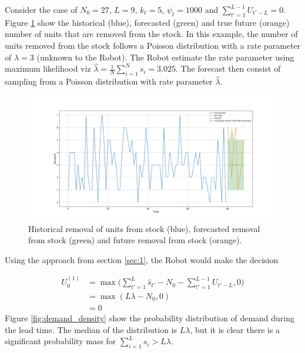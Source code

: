 \begin{example}
	Consider the case of $N_0=27$, $L = 9$, $k_t=5$, $\psi_t=1000$ and $\sum_{t'=1}^{L-1}U_{t'-L}=0$. Figure \ref{fig:forecast_example} show the historical (blue), forecasted (green) and true future (orange) number of units that are removed from the stock. In this example, the number of units removed from the stock follows a Poisson distribution with a rate parameter of $\lambda= 3$ (unknown to the Robot). The Robot estimate the rate parameter using maximum likelihood viz $\hat{\lambda}= \frac{1}{N}\sum_{i=1}^{N}s_i=3.025$. The forecast then consist of sampling from a Poisson distribution with rate parameter $\hat{\lambda}$.
	\begin{figure}[H]
		\centering
		\includegraphics[width = 1\textwidth]{figures/forecast_example.png}
		\caption{Historical removal of units from stock (blue), forecasted removal from stock (green) and future removal from stock (orange).}
		\label{fig:forecast_example}
	\end{figure}
	Using the approach from section \ref{sec:1}, the Robot would make the decision
	
	\begin{equation}
		\begin{split}
			U_0^{(1)} &= \max\bigg(\sum_{t'=1}^{L}\hat{s}_{t'}-N_{0}-\sum_{t'=1}^{L-1}U_{t'-L},0\bigg)\\
			&=  \max(L\lambda-N_0,0)\\
			& = 0
		\end{split}
	\end{equation}
	Figure \ref{fig:demand_density} show the probability distribution of demand during the lead time. The median of the distribution is $L\lambda$, but it is clear there is a significant probability mass for $\sum_{i=1}^{L}s_i>L\lambda$. 
	

\end{example}
